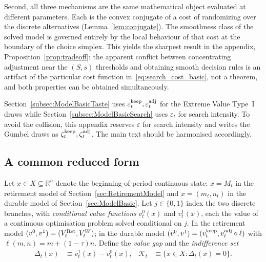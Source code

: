 Second, all three mechanisms are the same mathematical object evaluated at different
parameters. Each is the convex conjugate of a cost of randomizing over the discrete
alternatives (Lemma~\ref{lem:conjugate}). The smoothness class of the solved model is
governed entirely by the local behaviour of that cost at the boundary of the choice
simplex. This yields the sharpest result in the appendix,
Proposition~\ref{prop:tradeoff}: the apparent conflict between concentrating
adjustment near the $(S,s)$ thresholds and obtaining smooth decision rules is an
artifact of the particular cost function in~\eqref{eq:search_cost_basic}, not a
theorem, and both properties can be obtained simultaneously.

\begin{remark}[Notation]
\label{rem:notation}
Section~\ref{subsec:ModelBasicTaste} uses $\varepsilon_t^{\mathrm{keep}},\varepsilon_t^{\mathrm{adj}}$
for the Extreme Value Type~I draws while Section~\ref{subsec:ModelBasicSearch} uses
$\varepsilon_t$ for search intensity. To avoid the collision, this appendix reserves
$\varepsilon$ for search intensity and writes the Gumbel draws as
$\zeta_t^{\mathrm{keep}},\zeta_t^{\mathrm{adj}}$. The main text should be harmonised accordingly.
\end{remark}

\subsection{A common reduced form}
\label{subsec:smooth_framework}

Let $x\in X\subseteq\mathbb{R}^{n}$ denote the beginning-of-period continuous state:
$x=M_t$ in the retirement model of Section~\ref{sec:RetirementModel} and
$x=(m_t,n_t)$ in the durable model of Section~\ref{sec:ModelBasic}. Let
$j\in\{0,1\}$ index the two discrete branches, with \emph{conditional value functions}
$v_t^{0}(x)$ and $v_t^{1}(x)$, each the value of a continuous optimisation problem
solved conditional on $j$. In the retirement model $(v^0,v^1)=(V_t^{\mathrm{Ret}},V_t^{W})$;
in the durable model $(v^0,v^1)=(v_t^{\mathrm{keep}},v_t^{\mathrm{adj}}\circ\ell)$ with
$\ell(m,n)=m+(1-\tau)n$. Define the \emph{value gap} and the \emph{indifference set}
\begin{align}
\Delta_t(x) &\equiv v_t^{1}(x)-v_t^{0}(x),
&
\mathcal{K}_t &\equiv \{x\in X:\Delta_t(x)=0\}.
\end{align}

